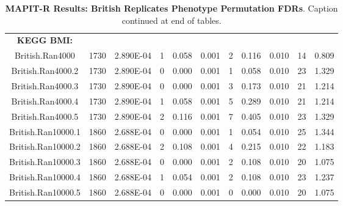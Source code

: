 \documentclass[12pt, a4paper]{article}
\begin{document}
\begin{landscape}
\begin{table}[ht]
\begin{tabular}{ccccccccccc}
  \\
  \textbf{KEGG BMI:} & & & & & & & & & \\
British.Ran4000 & 1730 & 2.890E-04 & 1 & 0.058 & 0.001 & 2 & 0.116 & 0.010 & 14 & 0.809 \\
  British.Ran4000.2 & 1730 & 2.890E-04 & 0 & 0.000 & 0.001 & 1 & 0.058 & 0.010 & 23 & 1.329 \\
  British.Ran4000.3 & 1730 & 2.890E-04 & 0 & 0.000 & 0.001 & 3 & 0.173 & 0.010 & 21 & 1.214 \\
  British.Ran4000.4 & 1730 & 2.890E-04 & 1 & 0.058 & 0.001 & 5 & 0.289 & 0.010 & 21 & 1.214 \\
  British.Ran4000.5 & 1730 & 2.890E-04 & 2 & 0.116 & 0.001 & 7 & 0.405 & 0.010 & 23 & 1.329 \\
  British.Ran10000.1 & 1860 & 2.688E-04 & 0 & 0.000 & 0.001 & 1 & 0.054 & 0.010 & 25 & 1.344 \\
  British.Ran10000.2 & 1860 & 2.688E-04 & 2 & 0.108 & 0.001 & 4 & 0.215 & 0.010 & 22 & 1.183 \\
  British.Ran10000.3 & 1860 & 2.688E-04 & 0 & 0.000 & 0.001 & 2 & 0.108 & 0.010 & 20 & 1.075 \\
  British.Ran10000.4 & 1860 & 2.688E-04 & 1 & 0.054 & 0.001 & 2 & 0.108 & 0.010 & 23 & 1.237 \\
  British.Ran10000.5 & 1860 & 2.688E-04 & 0 & 0.000 & 0.001 & 0 & 0.000 & 0.010 & 20 & 1.075 \\
   \hline
\end{tabular}
\caption[TBD]{\textbf{MAPIT-R Results: British Replicates Phenotype Permutation FDRs}. Caption continued at end of tables.}
\label{InterPath-Supp-Tables-BritReps-FDRs-pt1}
\end{table}
\end{landscape}
\clearpage
\setlength{\footskip}{1cm}
\addtocounter{table}{-1}
\end{document}
